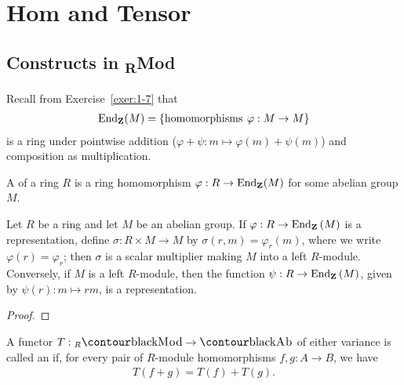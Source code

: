 \chapter{Hom and Tensor}\label{chapter:hom-tensor}

\section{Constructs in \textsubscript{R}Mod}
    \begin{note}
        Recall from Exercise~\ref{exer:1-7} that 
            \begin{equation*}
            \begin{split}
                \operatorname{End}_{\mathbf{Z}}(M) = \{\text{homomorphisms}\hspace{4pt}\varphi:M \rightarrow M\}
            \end{split} 
            \end{equation*}
        is a ring under pointwise addition ($\varphi+\psi:m \mapsto \varphi(m) + \psi(m)$) and composition as multiplication.
    \end{note}

    \begin{definition}\label{def:representations}
        A  of a ring $R$ is a ring homomorphism $\varphi:R \rightarrow \operatorname{End}_{\mathbf{Z}}(M)$ for some abelian group $M$.
    \end{definition}

    \begin{proposition}
        Let $R$ be a ring and let $M$ be an abelian group. If $\varphi:R \rightarrow \operatorname{End}_{\mathbf{Z}}{(M)}$ is a representation, define $\sigma:R \times M \rightarrow M$ by $\sigma(r,m) = \varphi_r(m)$, where we write $\varphi(r) = \varphi_r$; then $\sigma $ is a scalar multiplier making $M$ into a left $R$-module. Conversely, if $M$ is a left $R$-module, then the function $\psi:R \rightarrow \operatorname{End}_{\mathbf{Z}}{(M)}$, given by $\psi(r): m \mapsto rm$, is a representation.
    \end{proposition}
        \begin{proof}
        

        \end{proof}

    \begin{definition}
        A functor $T: {}_{R}\cMod \rightarrow \cAb$ of either variance is called an  if, for every pair of $R$-module homomorphisms $f,g:A \rightarrow B$, we have
            \begin{equation*}
            \begin{split}
                T(f+g) = T(f) + T(g).
            \end{split}
            \end{equation*}
    \end{definition}


